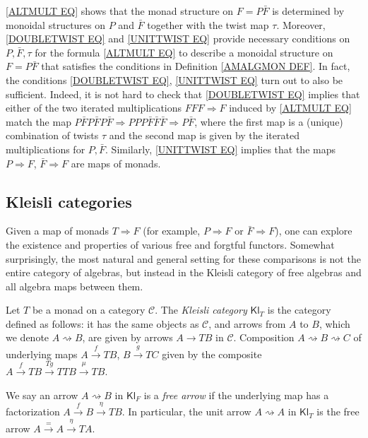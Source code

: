 \documentclass[a4paper,10pt
,draft
]{article}%
\renewcommand{\1}{\eta}%
\newcommand{\Kl}{\mathsf{Kl}}
\begin{document}
\begin{remark}\label{ALTMULT REM}
\eqref{ALTMULT EQ} shows that the monad structure on $F=P\bar{F}$ is determined by monoidal structures on $P$ and $\bar{F}$ together with  the twist map $\tau$.
Moreover, \eqref{DOUBLETWIST EQ} and \eqref{UNITTWIST EQ} provide necessary conditions on $P,\bar{F},\tau$
for the formula \eqref{ALTMULT EQ}
to describe a monoidal structure on $F=P\bar{F}$
that satisfies the conditions in 
Definition \ref{AMALGMON DEF}.
In fact, the conditions \eqref{DOUBLETWIST EQ}, \eqref{UNITTWIST EQ}
turn out to also be sufficient.
Indeed, it is not hard to check 
that \eqref{DOUBLETWIST EQ} implies that either of the two iterated multiplications
$FFF \Rightarrow F$ induced by \eqref{ALTMULT EQ}
match the map 
$P\bar{F} P\bar{F} P \bar{F} \Rightarrow 
PPP \bar{F} \bar{F} \bar{F} \Rightarrow P \bar{F}$,
where the first map is a (unique) combination of twists $\tau$
and the second map is given by the iterated multiplications for $P,\bar{F}$.
Similarly, \eqref{UNITTWIST EQ} implies that the maps
$P \Rightarrow F$, $\bar{F} \Rightarrow F$
are maps of monads.
\end{remark}



\subsection{Kleisli categories}

Given a map of monads $T \Rightarrow F$ (for example, $P \Rightarrow F$ or $\bar F \Rightarrow F$), one can explore the existence and properties of various free and forgtful functors.
Somewhat surprisingly, the most natural and general setting for these comparisons is not the entire category of algebras,
but instead in the Kleisli category of free algebras and all algebra maps between them.

\begin{definition}[{\cite{Kl65}}]
      Let $T$ be a monad on a category $\mathcal C$.
      The \textit{Kleisli category} $\mathsf{Kl}_T$ is the category defined as follows:
      it has the same objects as $\mathcal{C}$,
      and arrows from $A$ to $B$,
      which we denote $A \rightsquigarrow B$,
      are given by arrows $A \to TB$ in $\mathcal{C}$.
      Composition
      $A \rightsquigarrow B \rightsquigarrow C$
      of underlying maps 
      $A \xrightarrow{f} TB$,
      $B \xrightarrow{g} TC$
      given by the composite
      $A \xrightarrow{f} TB \xrightarrow{Tg} TTB \xrightarrow{\mu} TB$.

      We say an arrow
      $A \rightsquigarrow B$ in $\mathsf{Kl}_F$ is a 
      \emph{free arrow}
      if the underlying map has a factorization
      $A \xrightarrow{f} B \xrightarrow{\eta} TB$.
      In particular, the unit arrow $A \rightsquigarrow A$ in $\Kl_T$
      is the free arrow $A \xrightarrow{=} A \xrightarrow{\eta} TA$.
\end{definition}
\end{document}
